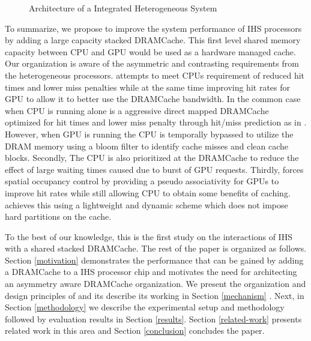 
\begin{figure*}[!htb]
    \centering
    \hsacpu
    \caption{Architecture of a Integrated Heterogeneous System}
    \label{hsa-arch}
\end{figure*}

To summarize, we propose to improve the system performance of IHS processors by adding a large capacity stacked DRAMCache. This first level shared memory capacity between CPU and GPU would be used as a hardware managed cache. Our organization \textit{\cachename} is aware of the asymmetric and contrasting requirements from the heterogeneous processors. \textit{\cachename} attempts to meet CPUs requirement of reduced hit times and lower miss penalties while at the same time improving hit rates for GPU to allow it to better use the DRAMCache bandwidth. In the common case when CPU is running alone \textit{\cachename} is a aggressive direct mapped DRAMCache optimized for hit times and lower miss penalty through hit/miss prediction as in \cite{alloy}. However, when GPU is running the CPU is temporally bypassed to utilize the DRAM memory using a bloom filter to identify cache misses and clean cache blocks. Secondly, The CPU is also prioritized at the DRAMCache to reduce the effect of large waiting times caused due to burst of GPU requests. Thirdly, \cachename forces spatial occupancy control by providing a pseudo associativity for GPUs to improve hit rates while still allowing CPU to obtain some benefits of caching. \cachename achieves this using a lightweight and dynamic scheme which does not impose hard partitions on the cache.

\par To the best of our knowledge, this is the first study on the interactions of IHS with a shared stacked DRAMCache. The rest of the paper is organized as follows. Section \ref{motivation} demonstrates the performance that can be gained by adding a DRAMCache to a IHS processor chip and motivates the need for architecting an asymmetry aware DRAMCache organization. We present the organization and design principles of \cachename and its describe its working in Section \ref{mechanism} . Next, in Section \ref{methodology} we describe the experimental setup and methodology followed by evaluation results in Section \ref{results}. Section \ref{related-work} presents related work in this area and Section \ref{conclusion} concludes the paper.

